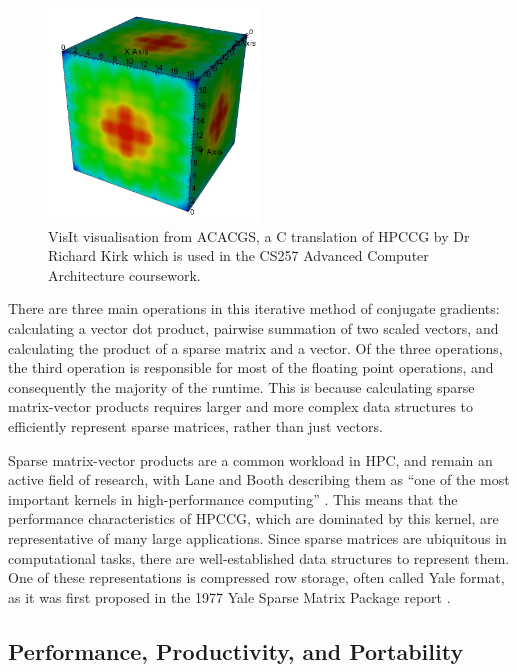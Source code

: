 \begin{figure}[H]
    \centering
    \includegraphics[width=0.5\textwidth]{images/2_background/acacgs_silo_output.png}
    \caption{VisIt visualisation from ACACGS, a C translation of HPCCG by Dr Richard Kirk which is used in the CS257 Advanced Computer Architecture coursework.}
    \label{fig:acacgs_silo_output}
\end{figure}

There are three main operations in this iterative method of conjugate gradients: calculating a vector dot product, pairwise summation of two scaled vectors, and calculating the product of a sparse matrix and a vector. Of the three operations, the third operation is responsible for most of the floating point operations, and consequently the majority of the runtime. This is because calculating sparse matrix-vector products requires larger and more complex data structures to efficiently represent sparse matrices, rather than just vectors.

Sparse matrix-vector products are a common workload in \acrshort{HPC}, and remain an active field of research, with Lane and Booth describing them as ``one of the most important kernels in high-performance computing'' \cite{laneHeterogeneousSparseMatrixVector2023}. This means that the performance characteristics of HPCCG, which are dominated by this kernel, are representative of many large applications. Since sparse matrices are ubiquitous in computational tasks, there are well-established data structures to represent them. One of these representations is compressed row storage, often called Yale format, as it was first proposed in the 1977 Yale Sparse Matrix Package report \cite{eisenstat1977yale}.

\subsection{Performance, Productivity, and Portability}
\label{ssec:p3hpc}


